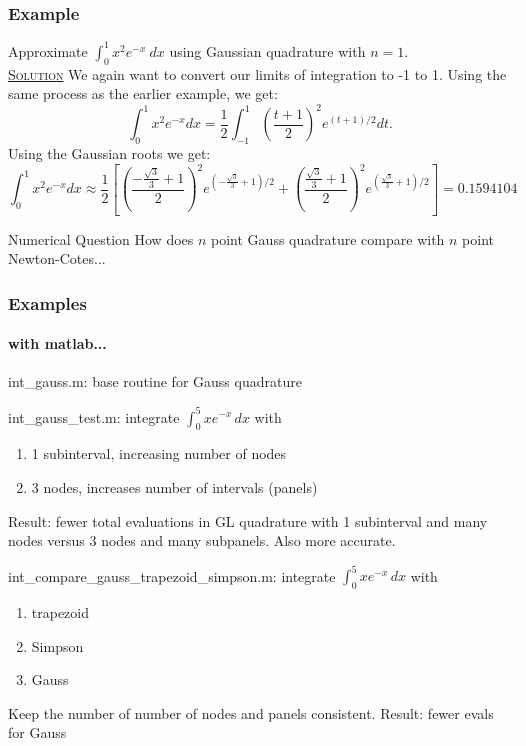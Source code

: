 \documentclass[10pt]{beamer}
\begin{document}
\begin{frame}
\frametitle{Example}
Approximate $\displaystyle \int_0^{1} x^2 e^{-x} ~dx$ using
Gaussian quadrature with $n=1$. \\
\underline{\textsc{Solution}} We again want to convert our limits
of integration to -1 to 1. Using the same process as the earlier
example, we get:
$$\int_0^1 x^2 e^{-x} dx = \frac{1}{2}\int_{-1}^1 \left(
\frac{t+1}{2}\right)^2 e^{(t+1)/2}dt.$$ Using the Gaussian roots
we get:
$$\int_0^1 x^2 e^{-x} dx \approx \frac{1}{2}\left[\left(\frac{-\frac{\sqrt{3}}{3}+1}{2}\right)^2 e^{(-\frac{\sqrt{3}}{3}+1)/2}
+ \left(\frac{\frac{\sqrt{3}}{3}+1}{2}\right)^2
e^{(\frac{\sqrt{3}}{3}+1)/2} \right] = 0.1594104$$
\end{frame}
\begin{frame}
\begin{block}{Numerical Question}
How does $n$ point Gauss quadrature compare with $n$ point Newton-Cotes...
\end{block}
\end{frame}
\begin{frame}[shrink]
\frametitle{Examples}
\framesubtitle{with matlab...}
\begin{example}
  int\_gauss.m:  base routine for Gauss quadrature
\end{example}
\begin{example}
  int\_gauss\_test.m: integrate $\int_{0}^{5} x e^{-x}\,dx$ with
  \begin{enumerate}
    \item 1 subinterval, increasing number of nodes
    \item 3 nodes, increases number of intervals (panels)
  \end{enumerate}
  Result: fewer total evaluations in GL quadrature with 1 subinterval and many
  nodes versus 3 nodes and many subpanels.  Also more accurate.
\end{example}
\begin{example}
  int\_compare\_gauss\_trapezoid\_simpson.m: integrate $\int_{0}^{5} x e^{-x}\,dx$ with
  \begin{enumerate}
    \item trapezoid
    \item Simpson
    \item Gauss
  \end{enumerate}
  Keep the number of number of nodes and panels consistent.  Result: fewer evals
for Gauss
\end{example}
\end{frame}
\end{document}
